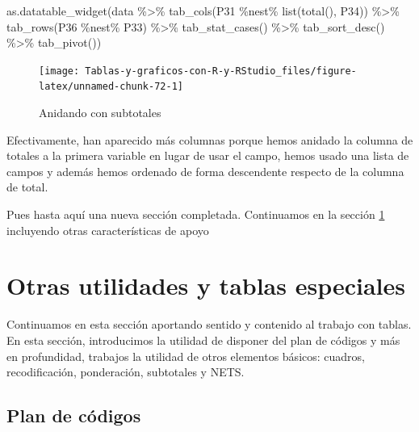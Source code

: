 \documentclass[
]{book}
\newenvironment{Shaded}{\begin{snugshade}}{\end{snugshade}}
\newcommand{\FunctionTok}[1]{\textcolor[rgb]{0.00,0.00,0.00}{#1}}
\newcommand{\NormalTok}[1]{#1}
\newcommand{\SpecialCharTok}[1]{\textcolor[rgb]{0.00,0.00,0.00}{#1}}
\begin{document}
\begin{Shaded}
\begin{Highlighting}[]
\FunctionTok{as.datatable\_widget}\NormalTok{(data }\SpecialCharTok{\%\textgreater{}\%}
  \FunctionTok{tab\_cols}\NormalTok{(P31 }\SpecialCharTok{\%nest\%} \FunctionTok{list}\NormalTok{(}\FunctionTok{total}\NormalTok{(), P34)) }\SpecialCharTok{\%\textgreater{}\%}
  \FunctionTok{tab\_rows}\NormalTok{(P36 }\SpecialCharTok{\%nest\%}\NormalTok{ P33) }\SpecialCharTok{\%\textgreater{}\%}
  \FunctionTok{tab\_stat\_cases}\NormalTok{() }\SpecialCharTok{\%\textgreater{}\%}
  \FunctionTok{tab\_sort\_desc}\NormalTok{() }\SpecialCharTok{\%\textgreater{}\%}
  \FunctionTok{tab\_pivot}\NormalTok{())}
\end{Highlighting}
\end{Shaded}

\begin{figure}[H]

{\centering \texttt{[image: Tablas-y-graficos-con-R-y-RStudio\_files/figure-latex/unnamed-chunk-72-1]} 

}

\caption{Anidando con subtotales}\label{fig:unnamed-chunk-72}
\end{figure}

Efectivamente, han aparecido más columnas porque hemos anidado la columna de totales a la primera variable en lugar de usar el campo, hemos usado una lista de campos y además hemos ordenado de forma descendente respecto de la columna de total.

Pues hasta aquí una nueva sección completada. Continuamos en la sección \ref{tse06} incluyendo otras características de apoyo

\hypertarget{tse06}{%
\chapter{Otras utilidades y tablas especiales}\label{tse06}}

Continuamos en esta sección aportando sentido y contenido al trabajo con tablas. En esta sección, introducimos la utilidad de disponer del plan de códigos y más en profundidad, trabajos la utilidad de otros elementos básicos: cuadros, recodificación, ponderación, subtotales y NETS.

\hypertarget{plan}{%
\section{Plan de códigos}\label{plan}}
\end{document}
